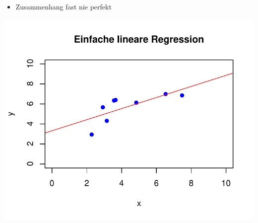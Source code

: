 \documentclass[aspectratio=169, journal, x11names, unknownkeysallowed, hyperref={colorlinks,
linkcolor = SS2,
urlcolor  = F3,
citecolor = F3,
anchorcolor = A4}, 12pt]{beamer}
\begin{document}
  \begin{frame}[t]
    \begin{minipage}[t]{0.45\textwidth}
      \vspace{-11.5em}
      \begin{itemize}
        \item Zusammenhang fast nie perfekt
      \end{itemize}
  \end{minipage}%
  \begin{minipage}[t]{0.45\textwidth}
    \centering
    \includegraphics[scale=0.5]{../Plots/reg_lin_3.pdf}
  \end{minipage}
\end{frame}
\end{document}
